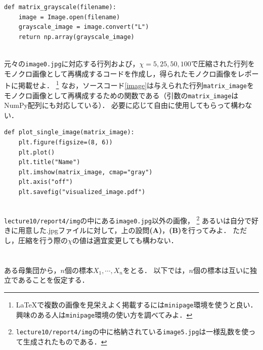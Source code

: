 \documentclass[a4paper,12pt]{jsarticle}
\begin{document}
\begin{lstlisting}[caption=画像ファイルのモノクロ化とその行列への変換,label=mono]
def matrix_grayscale(filename):
    image = Image.open(filename)
    grayscale_image = image.convert("L")  
    return np.array(grayscale_image)
\end{lstlisting}
~\\

元々の\texttt{image0.jpg}に対応する行列および，$\chi=5,25,50,100$で圧縮された行列をモノクロ画像として再構成するコードを作成し，得られたモノクロ画像をレポートに掲載せよ．
\footnote{\LaTeX で複数の画像を見栄えよく掲載するには\texttt{minipage}環境を使うと良い．興味のある人は\texttt{minipage}環境の使い方を調べてみよ．}
なお，ソースコード\ref{image}は与えられた行列\texttt{matrix\_image}をモノクロ画像として再構成するための関数である（引数の\texttt{matrix\_image}はNumPy配列にも対応している）．
必要に応じて自由に使用してもらって構わない．
\begin{lstlisting}[caption=行列をモノクロ画像として再構成,label=image]
def plot_single_image(matrix_image):
    plt.figure(figsize=(8, 6))
    plt.plot()
    plt.title("Name")
    plt.imshow(matrix_image, cmap="gray")
    plt.axis("off")
    plt.savefig("visualized_image.pdf")
\end{lstlisting}
~\\

\texttt{lecture10/report4/img}の中にある\texttt{image0.jpg}以外の画像，
\footnote{
\texttt{lecture10/report4/img}の中に格納されている\texttt{image5.jpg}は一様乱数を使って生成されたものである．
}
あるいは自分で好きに用意した.jpgファイルに対して，上の設問{\bf (A)}，{\bf (B)}を行ってみよ．
ただし，圧縮を行う際の$\chi$の値は適宜変更しても構わない．



\section{}
\label{sec:problem_3}

ある母集団から，$n$個の標本$X_{1},\cdots,X_{n}$をとる．
以下では，$n$個の標本は互いに独立であることを仮定する．
\end{document}
